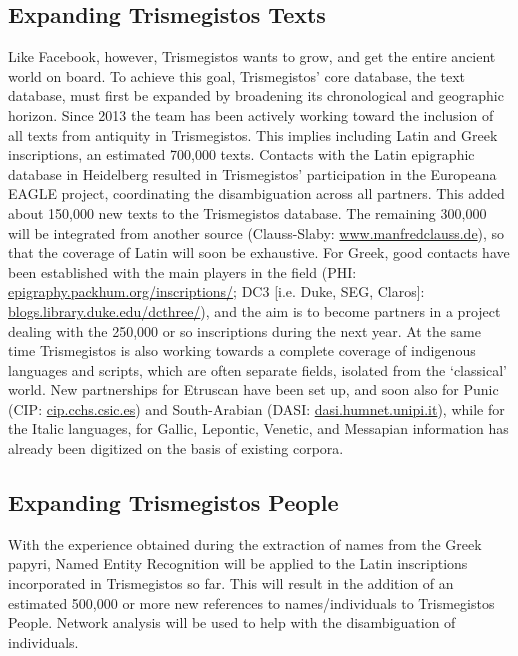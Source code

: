 \documentclass[amsthm,ebook]{saparticle}
\begin{document}
\subsection{Expanding Trismegistos Texts}


\noindent Like Facebook, however, Trismegistos wants to grow, and get the entire ancient world on board. To achieve this goal,
Trismegistos' core database, the text database, must first be expanded by broadening its chronological and geographic
horizon. Since 2013 the team has been actively working toward the inclusion of all texts from antiquity in
Trismegistos. This implies including Latin and Greek inscriptions, an estimated 700,000 texts. Contacts with the Latin
epigraphic database in Heidelberg resulted in Trismegistos' participation in the Europeana EAGLE project, coordinating
the disambiguation across all partners. This added about 150,000 new texts to the Trismegistos database. The remaining
300,000 will be integrated from another source (Clauss-Slaby: \url{www.manfredclauss.de}), so that the coverage of Latin will
soon be exhaustive. For Greek, good contacts have been established with the main players in the field (PHI:
\url{epigraphy.packhum.org/inscriptions/}; DC3 [i.e. Duke, SEG, Claros]: \url{blogs.library.duke.edu/dcthree/}), and the aim is to
become partners in a project dealing with the 250,000 or so inscriptions during the next year. At the same time
Trismegistos is also working towards a complete coverage of indigenous languages and scripts, which are often separate
fields, isolated from the `classical' world. New partnerships for Etruscan have been set up, and soon also for Punic
(CIP: \url{cip.cchs.csic.es}) and South-Arabian (DASI: \url{dasi.humnet.unipi.it}), while for the Italic languages, for Gallic,
Lepontic, Venetic, and Messapian information has already been digitized on the basis of existing corpora.




\subsection{Expanding Trismegistos People}


\noindent With the experience obtained during the extraction of names from the Greek papyri, Named Entity Recognition will be
applied to the Latin inscriptions incorporated in Trismegistos so far. This will result in the addition of an estimated
500,000 or more new references to names/individuals to Trismegistos People. Network analysis will be used to help with
the disambiguation of individuals.
\end{document}
